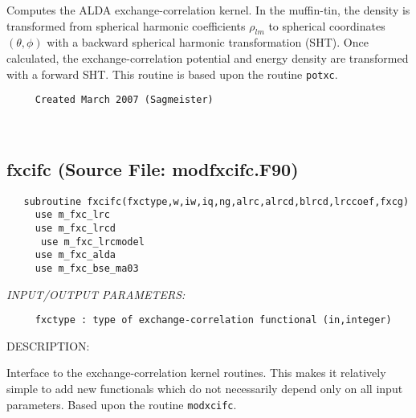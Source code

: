 \documentclass[11pt]{article}
\begin{document}
     Computes the ALDA exchange-correlation kernel. In the
     muffin-tin, the density is transformed from spherical harmonic coefficients
     $\rho_{lm}$ to spherical coordinates $(\theta,\phi)$ with a backward
     spherical harmonic transformation (SHT). Once calculated, the
     exchange-correlation potential and energy density are transformed with a
     forward SHT. This routine is based upon the routine {\tt potxc}.
  
\begin{verbatim}     Created March 2007 (Sagmeister)\end{verbatim}












 
 
\mbox{}\hrulefill\ 
 
\subsection{fxcifc (Source File: modfxcifc.F90)}


\begin{verbatim}   subroutine fxcifc(fxctype,w,iw,iq,ng,alrc,alrcd,blrcd,lrccoef,fxcg)
     use m_fxc_lrc
     use m_fxc_lrcd
      use m_fxc_lrcmodel
     use m_fxc_alda
     use m_fxc_bse_ma03\end{verbatim}{\em INPUT/OUTPUT PARAMETERS:}
\begin{verbatim}     fxctype : type of exchange-correlation functional (in,integer)\end{verbatim}
{\sf DESCRIPTION:\\ }


     Interface to the exchange-correlation kernel routines. This makes it 
     relatively
     simple to add new functionals which do not necessarily depend only on
     all input parameters. Based upon the routine {\tt modxcifc}.
  
\end{document}
